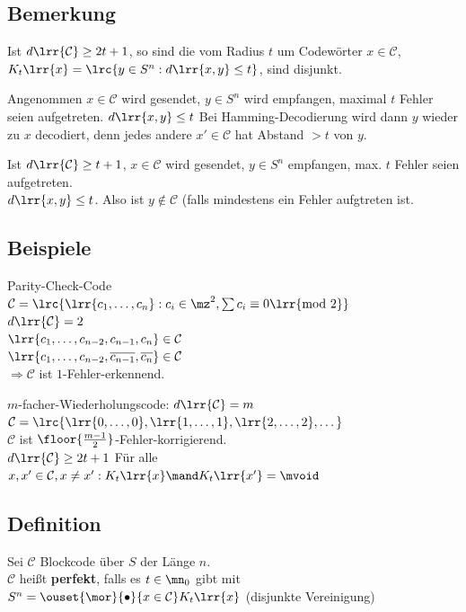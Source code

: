 	\subsection{Bemerkung}
			\item Ist $d\lrr{\mathcal{C}}\geq 2t+1$, so sind die  vom Radius $t$ um Codewörter $x\in\mathcal{C}$, $K_t\lrr{x}=\lrc{y\in S^n: d\lrr{x,y}\leq t}$, sind disjunkt.
			
				Angenommen $x\in\mathcal{C}$ wird gesendet, $y\in S^n$ wird empfangen, maximal $t$ Fehler seien aufgetreten. $d\lrr{x,y}\leq t$ Bei Hamming-Decodierung wird dann $y$ wieder zu $x$ decodiert, denn jedes andere $x'\in\mathcal{C}$ hat Abstand $>t$ von $y$.
				
			\item Ist $d\lrr{\mathcal{C}}\geq t+1$, $x\in\mathcal{C}$ wird gesendet, $y\in S^n$ empfangen, max. $t$ Fehler seien aufgetreten.\\
				$d\lrr{x,y}\leq t$. Also ist $y\notin\mathcal{C}$ (falls mindestens ein Fehler aufgtreten ist.
		\subExEnd
		
	\subsection{Beispiele}
			\item Parity-Check-Code\\
				$\mathcal{C}=\lrc{\lrr{c_1,\dots,c_n}:c_i\in\mz^2,\sum c_i\equiv 0\lrr{\mbox{mod }2}}$\\
				$d\lrr{\mathcal{C}}=2$\\
				$\lrr{c_1,\dots,c_{n-2},c_{n-1},c_n}\in\mathcal{C}$\\
				$\lrr{c_1,\dots,c_{n-2},\overline{c_{n-1}},\overline{c_n}}\in\mathcal{C}$\\
				$\Rightarrow\mathcal{C}$ ist $1$-Fehler-erkennend.
			\item $m$-facher-Wiederholungscode: $d\lrr{\mathcal{C}}=m$\\
				$\mathcal{C}=\lrc{\lrr{0,\dots,0},\lrr{1,\dots,1},\lrr{2,\dots,2},\dots}$\\
				$\mathcal{C}$ ist $\floor{\frac{m-1}{2}}$-Fehler-korrigierend.\\
				$d\lrr{\mathcal{C}}\geq 2t+1$ Für alle $x,x'\in \mathcal{C}, x\neq x': K_t\lrr{x}\mand K_t\lrr{x'}=\mvoid$
		\subExEnd
		
	\subsection{Definition}
		Sei $\mathcal{C}$ Blockcode über $S$ der Länge $n$.\\
		$\mathcal{C}$ heißt \textbf{perfekt}, falls es $t\in\mn_0$ gibt mit $S^n=\ouset{\mor}{\bullet}{x\in\mathcal{C}}K_t\lrr{x}$ (disjunkte Vereinigung)
	
